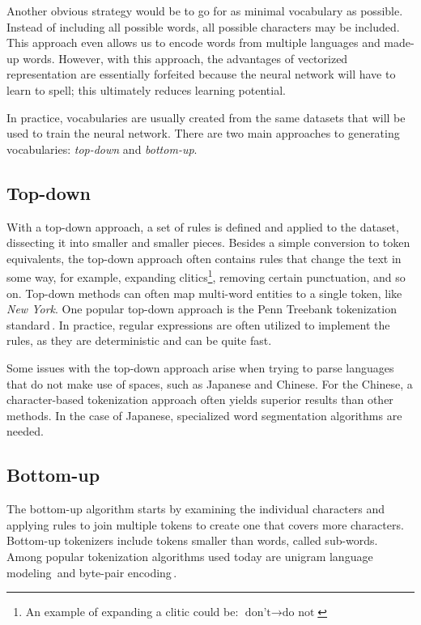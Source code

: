 Another obvious strategy would be to go for as minimal vocabulary as possible. Instead of including all possible words, all possible characters may be included. This approach even allows us to encode words from multiple languages and made-up words. However, with this approach, the advantages of vectorized representation are essentially forfeited because the neural network will have to learn to spell; this ultimately reduces learning potential.

In practice, vocabularies are usually created from the same datasets that will be used to train the neural network. There are two main approaches to generating vocabularies: \emph{top-down} and \emph{bottom-up}.

\subsection{Top-down}
With a top-down approach, a set of rules is defined and applied to the dataset, dissecting it into smaller and smaller pieces. Besides a simple conversion to token equivalents, the top-down approach often contains rules that change the text in some way, for example, expanding clitics\footnote{An example of expanding a clitic could be: $\text{don't} \rightarrow \text{do not}$}, removing certain punctuation, and so on. Top-down methods can often map multi-word entities to a single token, like \emph{New York}. One popular top-down approach is the Penn Treebank tokenization standard\,\cite{marcus-etal-1993-building}. In practice, regular expressions are often utilized to implement the rules, as they are deterministic and can be quite fast.

Some issues with the top-down approach arise when trying to parse languages that do not make use of spaces, such as Japanese and Chinese. For the Chinese, a character-based tokenization approach often yields superior results than other methods. In the case of Japanese, specialized word segmentation algorithms are needed.

\subsection{Bottom-up}
The bottom-up algorithm starts by examining the individual characters and applying rules to join multiple tokens to create one that covers more characters. Bottom-up tokenizers include tokens smaller than words, called sub-words. Among popular tokenization algorithms used today are unigram language modeling\,\cite{kudo-2018-subword} and byte-pair encoding\,\cite{sennrich-etal-2016-neural}.

